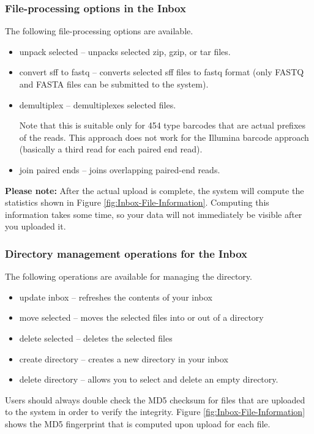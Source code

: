 \documentclass[12pt,fullpage]{report}
\begin{document}
\subsubsection{File-processing options in the Inbox}
The following file-processing options are available. 
\begin{itemize}
\item unpack selected --
unpacks selected zip, gzip, or tar files.
\item convert sff to fastq --
converts selected sff files to fastq format (only FASTQ and FASTA files can be submitted to the system).
\item demultiplex --
demultiplexes selected files.

Note that this is suitable only for 454 type barcodes that are actual prefixes of the reads. This approach does not work for the Illumina barcode approach (basically a third read for each paired end read).

\item join paired ends --
joins overlapping paired-end reads.
\end{itemize}


\textbf{Please note:} After the actual upload is complete, the system will compute the statistics shown in Figure \ref{fig:Inbox-File-Information}. Computing this information takes some time, so your data will not immediately be visible after you uploaded it.

\subsubsection{Directory management operations for the Inbox}
The following operations are available for managing the directory.

\begin{itemize}
\item update inbox --
refreshes the contents of your inbox
\item move selected --
 moves the selected files into or out of a directory
\item delete selected --
deletes the selected files
\item create directory --
creates a new directory in your inbox
\item delete directory --
allows you to select and delete an empty directory.
\end{itemize}

Users should always double check the \gls{MD5} checksum for files that are uploaded to the system in order to verify the integrity. Figure \ref{fig:Inbox-File-Information} shows the MD5 fingerprint that is computed upon upload for each file.
\end{document}
